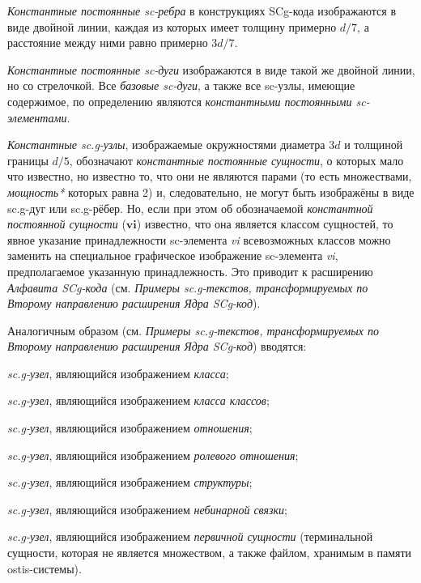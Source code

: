 \begin{textitemize}
	\item \textit{Константные постоянные sc-ребра} в конструкциях SCg-кода изображаются в виде двойной линии, каждая из которых имеет толщину примерно $d/7$, а расстояние между ними равно примерно $3d/7$. 
	\item \textit{Константные постоянные sc-дуги} изображаются в виде такой же двойной линии, но со стрелочкой. Все \textit{базовые sc-дуги}, а также все sc-узлы, имеющие содержимое, по определению являются \textit{константными постоянными sc-элементами}. 
	\item \textit{Константные sc.g-узлы}, изображаемые окружностями диаметра $3d$ и толщиной границы $d/5$, обозначают \textit{константные постоянные сущности}, о которых мало что известно, но известно то, что они не являются парами (то есть множествами, \textit{мощность*} которых равна 2) и, следовательно, не могут быть изображёны в виде sc.g-дуг или sc.g-рёбер. Но, если при этом об обозначаемой \textit{константной постоянной сущности} ($\bm{vi}$) известно, что она является классом сущностей, то явное указание принадлежности sc-элемента \textit{vi} всевозможных классов можно заменить на специальное графическое изображение sc-элемента \textit{vi}, предполагаемое указанную принадлежность. Это приводит к расширению  \textit{Алфавита SCg-кода\scnsupergroupsign} (см. \textit{Примеры sc.g-текстов, трансформируемых по Второму направлению расширения Ядра SCg-код}).
\end{textitemize}


Аналогичным образом (см. \textit{Примеры sc.g-текстов, трансформируемых по Второму направлению расширения Ядра SCg-код}) вводятся: 
\begin{textitemize}
	\item \textit{sc.g-узел}, являющийся изображением \textit{класса};  
	\item \textit{sc.g-узел}, являющийся изображением \textit{класса классов};  
	\item \textit{sc.g-узел}, являющийся изображением \textit{отношения}; 
	\item \textit{sc.g-узел}, являющийся изображением \textit{ролевого отношения}; 
	\item \textit{sc.g-узел}, являющийся изображением \textit{структуры};  
	\item \textit{sc.g-узел}, являющийся изображением \textit{небинарной связки};
	\item \textit{sc.g-узел}, являющийся изображением \textit{первичной сущности} (терминальной сущности, которая не является множеством, а также файлом, хранимым в памяти ostis-системы).
\end{textitemize}

